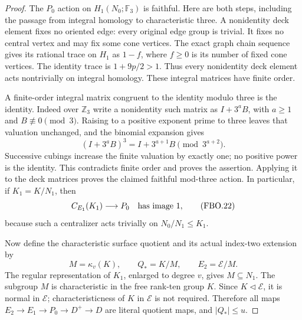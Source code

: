 \begin{proof}
The $P_0$ action on $H_1(N_0;\mathbb F_3)$ is faithful.
Here are both steps, including the passage from integral
homology to characteristic three.  A nonidentity deck element
fixes no oriented edge: every original edge group is trivial.
It fixes no central vertex and may fix some cone vertices.
The exact graph chain sequence gives its rational trace on
$H_1$ as $1-f$, where $f\geq0$ is its number of fixed cone
vertices.  The identity trace is $1+9p/2>1$.  Thus every
nonidentity deck element acts nontrivially on integral homology.
These integral matrices have finite order.

A finite-order integral matrix congruent to the identity modulo
three is the identity.  Indeed over $\mathbb Z_3$ write a
nonidentity such matrix as $I+3^aB$, with $a\geq1$ and
$B\not\equiv0\pmod3$.  Raising to a positive exponent prime
to three leaves that valuation unchanged, and the binomial
expansion gives
\[
 (I+3^aB)^3=I+3^{a+1}B\pmod {3^{a+2}}.
                                                               \tag{FBO.21}
\]
Successive cubings increase the finite valuation by exactly one;
no positive power is the identity.  This contradicts finite
order and proves the assertion.  Applying it to the deck
matrices proves the claimed faithful mod-three action.
In particular, if $K_1=K/N_1$, then
\[
                   C_{E_1}(K_1)\longrightarrow P_0
                       \quad\hbox{has image }1,
                                                               \tag{FBO.22}
\]
because such a centralizer acts trivially on
$N_0/N_1\leq K_1$.

Now define the characteristic surface quotient and its actual
index-two extension by
\[
 M=\kappa_v(K),\qquad Q_*=K/M,
 \qquad E_2=\mathcal E/M.
                                                               \tag{FBO.23}
\]
The regular representation of $K_1$, enlarged to degree $v$,
gives $M\subseteq N_1$.
The subgroup $M$ is characteristic in the free rank-ten group
$K$.  Since $K\triangleleft\mathcal E$, it is normal in
$\mathcal E$; characteristicness of $K$ in $\mathcal E$ is
not required.  Therefore all maps
$E_2\to E_1\to P_0\to D^+\to D$ are literal quotient maps,
and $|Q_*|\leq u$.


\end{proof}
